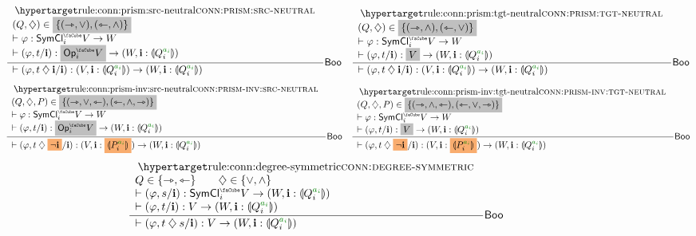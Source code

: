 \documentclass[a4paper]{memoir}
\begin{document}
\begin{figure}
	\[
		\inferencel{conn:prism:src-neutral}{
			(Q, \opA) \in \mathemph{\accol{(\jet, \vee), (\tej, \wedge)}} \\
			\sez \vfi : \UFsymcube_i V \to W \\
			\sez (\vfi, t / \dm i) : \mathemph{\Opcube_i V} \to (W, \dm i : \rival{Q_i\pmr{a_i}})
		}{
			\sez (\vfi, t \opA \dm i / \dm i) : (V, \dm i : \rival{Q_i\pmr{a_i}}) \to (W, \dm i : \rival{Q_i\pmr{a_i}})
		}{$\booleanalg$}
		\quad
		\inferencel{conn:prism:tgt-neutral}{
			(Q, \opA) \in \mathemph{\accol{(\jet, \wedge), (\tej, \vee)}} \\
			\sez \vfi : \UFsymcube_i V \to W \\
			\sez (\vfi, t / \dm i) : \mathemph{V} \to (W, \dm i : \rival{Q_i\pmr{a_i}})
		}{
			\sez (\vfi, t \opA \dm i / \dm i) : (V, \dm i : \rival{Q_i\pmr{a_i}}) \to (W, \dm i : \rival{Q_i\pmr{a_i}})
		}{$\booleanalg$}
	\]
	\[
		\inferencel{conn:prism-inv:src-neutral}{
			(Q, \opA, P) \in \mathemph{\accol{(\jet, \vee, \tej), (\tej, \wedge, \jet)}} \\
			\sez \vfi : \UFsymcube_i V \to W \\
			\sez (\vfi, t / \dm i) : \mathemph{\Opcube_i V} \to (W, \dm i : \rival{Q_i\pmr{a_i}})
		}{
			\sez (\vfi, t \opA \mathemphB{\lnot \dm i} / \dm i) : (V, \dm i : \mathemphB{\rival{P_i\pmr{a_i}}}) \to (W, \dm i : \rival{Q_i\pmr{a_i}})
		}{$\booleanalg$}
		\quad
		\inferencel{conn:prism-inv:tgt-neutral}{
			(Q, \opA, P) \in \mathemph{\accol{(\jet, \wedge, \tej), (\tej, \vee, \jet)}} \\
			\sez \vfi : \UFsymcube_i V \to W \\
			\sez (\vfi, t / \dm i) : \mathemph{V} \to (W, \dm i : \rival{Q_i\pmr{a_i}})
		}{
			\sez (\vfi, t \opA \mathemphB{\lnot \dm i} / \dm i) : (V, \dm i : \mathemphB{\rival{P_i\pmr{a_i}}}) \to (W, \dm i : \rival{Q_i\pmr{a_i}})
		}{$\booleanalg$}
	\]
	\[
		\inferencel{conn:degree-symmetric}{
			Q \in \accol{\jet, \tej} \qquad
			\opA \in \accol{{\vee}, {\wedge}} \\
			\sez (\vfi, s / \dm i) : \UFsymcube_i V \to (W, \dm i : \rival{Q_i\pmr{a_i}}) \\
			\sez (\vfi, t / \dm i) : V \to (W, \dm i : \rival{Q_i\pmr{a_i}})
		}{
			\sez (\vfi, t \opA s / \dm i) : V \to (W, \dm i : \rival{Q_i\pmr{a_i}})
		}{$\booleanalg$}
	\]

\end{figure}
\end{document}
